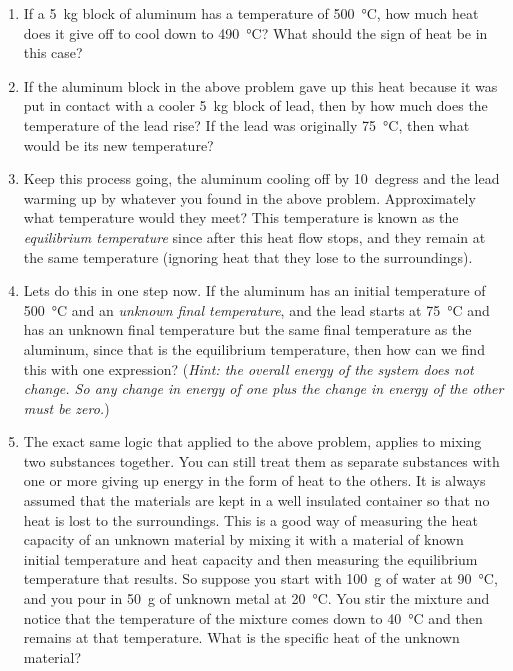 \begin{enumerate}
\item
If a \SI{5}{kg} block of aluminum has a temperature of \SI{500}{\celsius}, how much heat does it give off to cool down to \SI{490}{\celsius}? What should the sign of heat be in this case? 

\item If the aluminum block in the above problem gave up this heat because it was put in contact with a cooler \SI{5}{\kilogram} block of lead, then by how much does the temperature of the lead rise? If the lead was originally \SI{75}{\celsius}, then what would be its new temperature?

\item
Keep this process going, the aluminum cooling off by \SI{10}{degress} and the lead warming up by whatever you found in the above problem. Approximately what temperature would they meet? This temperature is known as the \emph{equilibrium temperature} since after this heat flow stops, and they remain at the same temperature (ignoring heat that they lose to the surroundings).

\item
Lets do this in one step now. If the aluminum has an initial temperature of \SI{500}{\celsius} and an \emph{unknown final temperature}, and the lead starts at \SI{75}{\celsius} and has an unknown final temperature but the same final temperature as the aluminum, since that is the equilibrium temperature, then how can we find this with one expression? (\emph{Hint: the overall energy of the system does not change. So any change in energy of one plus the change in energy of the other must be zero.})

\item
The exact same logic that applied to the above problem, applies to mixing two substances together. You can still treat them as separate substances with one or more giving up energy in the form of heat to the others. It is always assumed that the materials are kept in a well insulated container so that no heat is lost to the surroundings. This is a good way of measuring the heat capacity of an unknown material by mixing it with a material of known initial temperature and heat capacity and then measuring the equilibrium temperature that results. So suppose you start with \SI{100}{\gram} of water at \SI{90}{\celsius}, and you pour in \SI{50}{\gram} of unknown metal at \SI{20}{\celsius}. You stir the mixture and notice that the temperature of the mixture comes down to \SI{40}{\celsius} and then remains at that temperature. What is the specific heat of the unknown material?


\end{enumerate}
